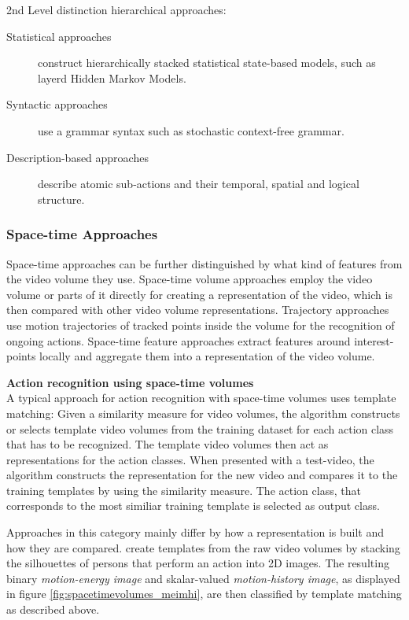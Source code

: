 2nd Level distinction hierarchical approaches:
\begin{description}
    \item[Statistical approaches] construct hierarchically stacked statistical state-based models, such as layerd Hidden Markov Models.
    \item[Syntactic approaches] use a grammar syntax such as stochastic context-free grammar.
    \item[Description-based approaches] describe atomic sub-actions and their temporal, spatial and logical structure.
\end{description}


\subsubsection{Space-time Approaches}
Space-time approaches can be further distinguished by what kind of features from the video volume they use.
Space-time volume approaches employ the video volume or parts of it directly for creating a representation of the video, which is then compared with other video volume representations.
Trajectory approaches use motion trajectories of tracked points inside the volume for the recognition of ongoing actions.
Space-time feature approaches extract features around interest-points locally and aggregate them into a representation of the video volume.


\textbf{Action recognition using space-time volumes} \\
A typical approach for action recognition with space-time volumes uses template matching:
Given a similarity measure for video volumes, the algorithm constructs or selects template video volumes from the training dataset for each action class that has to be recognized.
The template video volumes then act as representations for the action classes.
When presented with a test-video, the algorithm constructs the representation for the new video and compares it to the training templates by using the similarity measure.
The action class, that corresponds to the most similiar training template is selected as output class.

Approaches in this category mainly differ by how a representation is built and how they are compared.
\textcite{bobick_recognition_2001} create templates from the raw video volumes by stacking the silhouettes of persons that perform an action into 2D images.
The resulting binary \textit{motion-energy image} and skalar-valued \textit{motion-history image}, as displayed in figure \ref{fig:spacetimevolumes_meimhi}, are then classified by template matching as described above.


